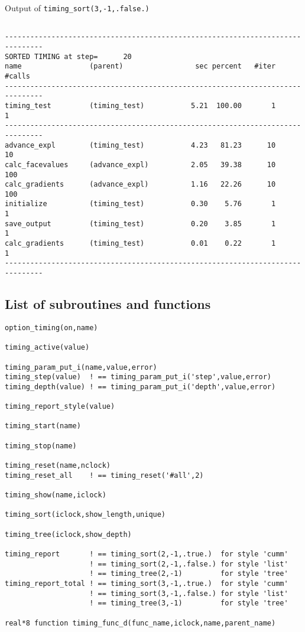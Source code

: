 \documentclass[10pt]{article}
\begin{document}
\begin{table}
\caption{Output of {\tt timing\_sort(3,-1,.false.)}}
{\footnotesize
\begin{verbatim}

-------------------------------------------------------------------------------
SORTED TIMING at step=      20
name                (parent)                 sec percent   #iter  #calls
-------------------------------------------------------------------------------
timing_test         (timing_test)           5.21  100.00       1       1
-------------------------------------------------------------------------------
advance_expl        (timing_test)           4.23   81.23      10      10
calc_facevalues     (advance_expl)          2.05   39.38      10     100
calc_gradients      (advance_expl)          1.16   22.26      10     100
initialize          (timing_test)           0.30    5.76       1       1
save_output         (timing_test)           0.20    3.85       1       1
calc_gradients      (timing_test)           0.01    0.22       1       1
-------------------------------------------------------------------------------

\end{verbatim}
}
\label{t-timinglist3}
\end{table}

\newpage
\subsection{List of subroutines and functions}

\begin{verbatim}
option_timing(on,name)

timing_active(value)

timing_param_put_i(name,value,error)
timing_step(value)  ! == timing_param_put_i('step',value,error)
timing_depth(value) ! == timing_param_put_i('depth',value,error)

timing_report_style(value)

timing_start(name)

timing_stop(name)

timing_reset(name,nclock)
timing_reset_all    ! == timing_reset('#all',2)

timing_show(name,iclock)

timing_sort(iclock,show_length,unique)

timing_tree(iclock,show_depth)

timing_report       ! == timing_sort(2,-1,.true.)  for style 'cumm'
                    ! == timing_sort(2,-1,.false.) for style 'list'
                    ! == timing_tree(2,-1)         for style 'tree'
timing_report_total ! == timing_sort(3,-1,.true.)  for style 'cumm'
                    ! == timing_sort(3,-1,.false.) for style 'list'
                    ! == timing_tree(3,-1)         for style 'tree'

real*8 function timing_func_d(func_name,iclock,name,parent_name)
\end{verbatim}
\end{document}
